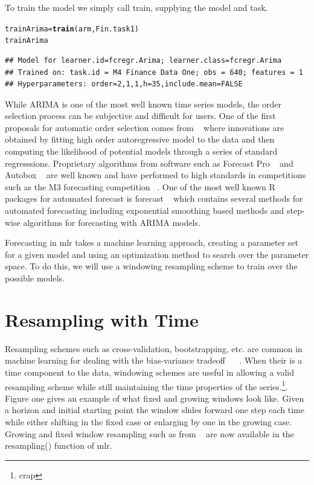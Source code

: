 \documentclass{article}\usepackage[]{graphicx}\usepackage[]{color}
\makeatletter
\newcommand{\hlstd}[1]{\textcolor[rgb]{0.345,0.345,0.345}{#1}}%
\newcommand{\hlkwb}[1]{\textcolor[rgb]{0.69,0.353,0.396}{#1}}%
\newcommand{\hlkwd}[1]{\textcolor[rgb]{0.737,0.353,0.396}{\textbf{#1}}}%
\newenvironment{kframe}{%
 \def\at@end@of@kframe{}%
 \ifinner\ifhmode%
  \def\at@end@of@kframe{\end{minipage}}%
  \begin{minipage}{\columnwidth}%
 \fi\fi%
 \def\FrameCommand##1{\hskip\@totalleftmargin \hskip-\fboxsep
 \colorbox{shadecolor}{##1}\hskip-\fboxsep
     \hskip-\linewidth \hskip-\@totalleftmargin \hskip\columnwidth}%
 \MakeFramed {\advance\hsize-\width
   \@totalleftmargin\z@ \linewidth\hsize
   \@setminipage}}%
 {\par\unskip\endMakeFramed%
 \at@end@of@kframe}
\newenvironment{knitrout}{}{} %
\theoremstyle{definition}
\newcommand\code{\@codex}
\def\@codex#1{{\normalfont\ttfamily\hyphenchar\font=-1 #1}}
\let\proglang=\textsf
\newcommand{\pkg}[1]{{\fontseries{b}\selectfont #1}}
\makeatother
\begin{document}
To train the model we simply call train, supplying the model and task.

\begin{knitrout}
\color{fgcolor}\begin{kframe}
\begin{alltt}
\hlstd{trainArima} \hlkwb{=} \hlkwd{train}\hlstd{(arm, Fin.task1 )}
\hlstd{trainArima}
\end{alltt}
\begin{verbatim}
## Model for learner.id=fcregr.Arima; learner.class=fcregr.Arima
## Trained on: task.id = M4 Finance Data One; obs = 640; features = 1
## Hyperparameters: order=2,1,1,h=35,include.mean=FALSE
\end{verbatim}
\end{kframe}
\end{knitrout}

While ARIMA is one of the most well known time series models, the order selection process can be subjective and difficult for users. One of the first proposals for automatic order selection comes from ~\cite{hannanOrder} where innovations are obtained by fitting high order autoregressive model to the data and then computing the likelihood of potential models through a series of standard regresssions. Proprietary algorithms from software such as \proglang{Forecast Pro} ~\cite{forecastpro} and \proglang{Autobox} ~\cite{reillyautobox} are well known and have performed to high standards in competitions such as the M3 forecasting competition ~\cite{Makridakis2000451}. One of the most well known R packages for automated forecast is \pkg{forecast} ~\cite{HyndForecast} which contains several methods for automated forecasting including exponential smoothing based methods and step-wise algorithms for forecasting with ARIMA models.

Forecasting in \pkg{mlr} takes a machine learning approach, creating a parameter set for a given model and using an optimization method to search over the parameter space. To do this, we will use a windowing resampling scheme to train over the possible models.

\section{Resampling with Time}

Resampling schemes such as cross-validation, bootstrapping, etc. are common in machine learning for dealing with the bias-variance tradeoff ~\cite{Friedman1997} ~\cite{rodriguezkfold}. When their is a time component to the data, windowing schemes are useful in allowing a valid resampling scheme while still maintaining the time properties of the series.\footnote{crap}. Figure one gives an example of what fixed and growing windows look like. Given a horizon and initial starting point the window slides forward one step each time while either shifting in the fixed case or enlarging by one in the growing case. Growing and fixed window resampling such as from ~\cite{hyndman2014forecasting} are now available in the \code{resampling()} function of \pkg{mlr}. 
\end{document}
